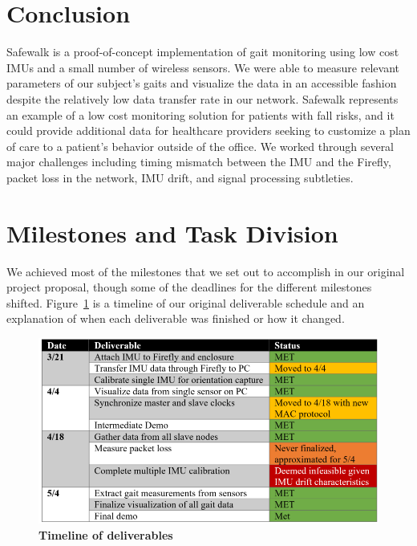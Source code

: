 \documentclass[conference]{IEEEtran}
\newcommand{\sys}{Safewalk\xspace}
\begin{document}
\section{Conclusion}
\sys is a proof-of-concept implementation of gait monitoring using low cost IMUs and
a small number of wireless sensors. We were able to measure relevant parameters of our
subject's gaits and visualize the data in an accessible fashion despite the relatively low
data transfer rate in our network. \sys represents an example of a low cost monitoring
solution for patients with fall risks, and it could provide additional data for healthcare
providers seeking to customize a plan of care to a patient's behavior outside of the
office. We worked through several major challenges including timing mismatch between the
IMU and the Firefly, packet loss in the network, IMU drift, and signal processing
subtleties.
\section{Milestones and Task Division}
We achieved most of the milestones that we set out to accomplish in our original project
proposal, though some of the deadlines for the different milestones shifted.
Figure~\ref{fig:table} is a timeline of our original deliverable schedule and an explanation
of when each deliverable was finished or how it changed. 

\begin{figure}[h]
  \centering
  \includegraphics[width=\columnwidth]{figs/table}
  \caption{{\bf Timeline of deliverables }}
  \label{fig:table}
\end{figure}
\end{document}
